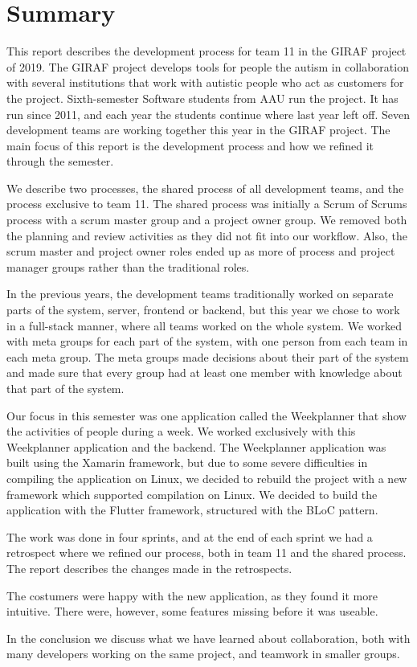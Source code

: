 \section{Summary}

This report describes the development process for team 11 in the GIRAF project of 2019. The GIRAF project develops tools for people the autism in collaboration with several institutions that work with autistic people who act as customers for the project. Sixth-semester Software students from AAU run the project. It has run since 2011, and each year the students continue where last year left off. Seven development teams are working together this year in the GIRAF project. The main focus of this report is the development process and how we refined it through the semester.

We describe two processes, the shared process of all development teams, and the process exclusive to team 11. The shared process was initially a Scrum of Scrums process with a scrum master group and a project owner group. We removed both the planning and review activities as they did not fit into our workflow. Also, the scrum master and project owner roles ended up as more of process and project manager groups rather than the traditional roles. 

In the previous years, the development teams traditionally worked on separate parts of the system, server, frontend or backend, but this year we chose to work in a full-stack manner, where all teams worked on the whole system. We worked with meta groups for each part of the system, with one person from each team in each meta group. The meta groups made decisions about their part of the system and made sure that every group had at least one member with knowledge about that part of the system. 

Our focus in this semester was one application called the Weekplanner that show the activities of people during a week. We worked exclusively with this Weekplanner application and the backend. The Weekplanner application was built using the Xamarin framework, but due to some severe difficulties in compiling the application on Linux, we decided to rebuild the project with a new framework which supported compilation on Linux. We decided to build the application with the Flutter framework, structured with the BLoC pattern. 

The work was done in four sprints, and at the end of each sprint we had a retrospect where we refined our process, both in team 11 and the shared process. The report describes the changes made in the retrospects.

The costumers were happy with the new application, as they found it more intuitive. There were, however, some features missing before it was useable. 

In the conclusion we discuss what we have learned about collaboration, both with many developers working on the same project, and teamwork in smaller groups. 
